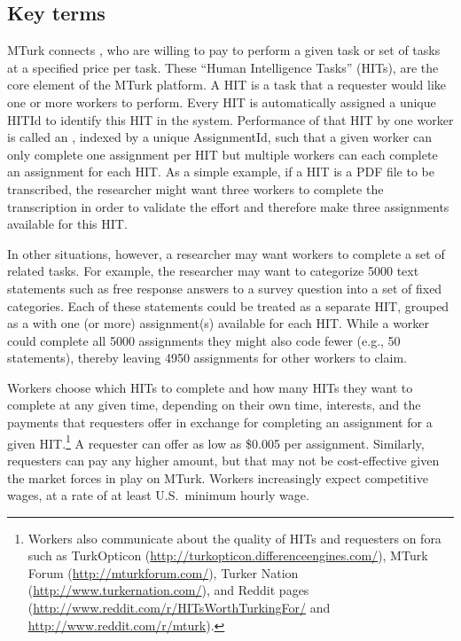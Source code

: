 \subsection{Key terms}
MTurk connects , who are willing to pay  to perform a given task or set of tasks at a specified price per task. These ``Human Intelligence Tasks'' (HITs), are the core element of the MTurk platform. A HIT is a task that a requester would like one or more workers to perform. Every HIT is automatically assigned a unique HITId to identify this HIT in the system. Performance of that HIT by one worker is called an , indexed by a unique AssignmentId, such that a given worker can only complete one assignment per HIT but multiple workers can each complete an assignment for each HIT. As a simple example, if a HIT is a PDF file to be transcribed, the researcher might want three workers to complete the transcription in order to validate the effort and therefore make three assignments available for this HIT.

In other situations, however, a researcher may want workers to complete a set of related tasks. For example, the researcher may want to categorize 5000 text statements such as free response answers to a survey question into a set of fixed categories. Each of these statements could be treated as a separate HIT, grouped as a  with one (or more) assignment(s) available for each HIT. While a worker could complete all 5000 assignments they might also code fewer (e.g., 50 statements), thereby leaving 4950 assignments for other workers to claim.

Workers choose which HITs to complete and how many HITs they want to
complete at any given time, depending on their own time, interests,
and the payments that requesters offer in exchange for completing an
assignment for a given HIT.\footnote{Workers also communicate about
  the quality of HITs and requesters on fora such as TurkOpticon
  (\url{http://turkopticon.differenceengines.com/}), MTurk Forum
  (\url{http://mturkforum.com/}), Turker Nation
  (\url{http://www.turkernation.com/}), and Reddit pages
  (\url{http://www.reddit.com/r/HITsWorthTurkingFor/} and
  \url{http://www.reddit.com/r/mturk}).} A requester can offer as low
as \$0.005 per assignment. Similarly, requesters can pay any higher
amount, but that may not be cost-effective given the market forces in
play on MTurk. Workers increasingly expect competitive wages, at a
rate of at least U.S.~minimum hourly wage.


